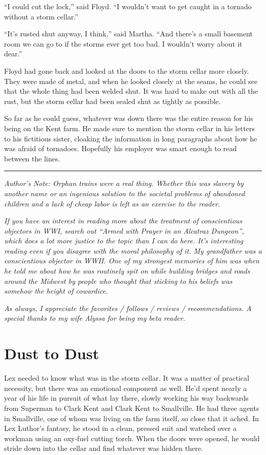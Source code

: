 \documentclass[ebook,12pt]{memoir}
\begin{document}
``I could cut the lock,'' said Floyd. ``I wouldn't want to get caught in
a tornado without a storm cellar.''

``It's rusted shut anyway, I think,'' said Martha. ``And there's a small
basement room we can go to if the storms ever get too bad. I wouldn't
worry about it dear.''

Floyd had gone back and looked at the doors to the storm cellar more
closely. They were made of metal, and when he looked closely at the
seams, he could see that the whole thing had been welded shut. It was
hard to make out with all the rust, but the storm cellar had been sealed
shut as tightly as possible.

So far as he could guess, whatever was down there was the entire reason
for his being on the Kent farm. He made sure to mention the storm cellar
in his letters to his fictitious sister, cloaking the information in
long paragraphs about how he was afraid of tornadoes. Hopefully his
employer was smart enough to read between the lines.

\begin{center}\rule{0.5\linewidth}{\linethickness}\end{center}

\emph{Author's Note: Orphan trains were a real thing. Whether this was
slavery by another name or an ingenious solution to the societal
problems of abandoned children and a lack of cheap labor is left as an
exercise to the reader.}

\emph{If you have an interest in reading more about the treatment of
conscientious objectors in WWI, search out ``Armed with Prayer in an
Alcatraz Dungeon'', which does a lot more justice to the topic than I
can do here. It's interesting reading even if you disagree with the
moral philosophy of it. My grandfather was a conscientious objector in
WWII. One of my strongest memories of him was when he told me about how
he was routinely spit on while building bridges and roads around the
Midwest by people who thought that sticking to his beliefs was somehow
the height of cowardice.}

\emph{As always, I appreciate the favorites / follows / reviews /
recommendations. A special thanks to my wife Alyssa for being my beta
reader.}
\chapter{Dust to Dust}\label{dust-to-dust}

Lex needed to know what was in the storm cellar. It was a matter of
practical necessity, but there was an emotional component as well. He'd
spent nearly a year of his life in pursuit of what lay there, slowly
working his way backwards from Superman to Clark Kent and Clark Kent to
Smallville. He had three agents in Smallville, one of whom was living on
the farm itself, so close that it ached. In Lex Luthor's fantasy, he
stood in a clean, pressed suit and watched over a workman using an
oxy‐fuel cutting torch. When the doors were opened, he would stride down
into the cellar and find whatever was hidden there.
\end{document}
